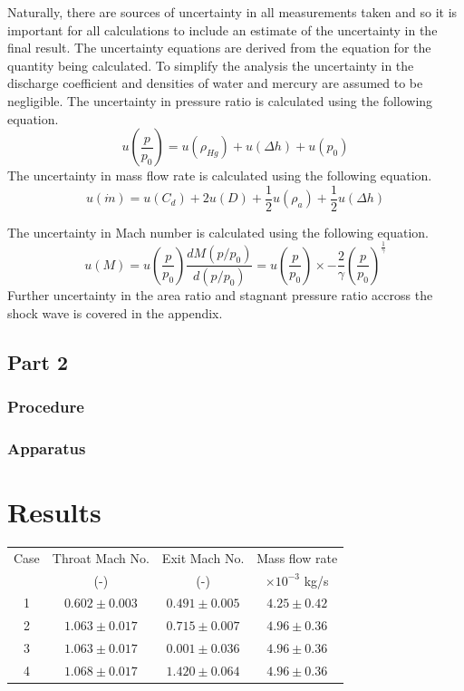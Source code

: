 \documentclass{article}
\begin{document}
Naturally, there are sources of uncertainty in all measurements taken and so it is important for all calculations to include an estimate of the uncertainty in the final result.
The uncertainty equations are derived from the equation for the quantity being calculated.
To simplify the analysis the uncertainty in the discharge coefficient and densities of water and mercury are assumed to be negligible.
The uncertainty in pressure ratio is calculated using the following equation.
\begin{equation}
    u\left( \frac{p}{p_0} \right) = u(\rho_{Hg}) + u(\Delta h) + u(p_0)
\end{equation}
The uncertainty in mass flow rate is calculated using the following equation.
\begin{equation}
    u(\dot{m}) = u(C_d) + 2u(D) + \frac{1}{2}u(\rho_a) + \frac{1}{2}u(\Delta h)
\end{equation}

The uncertainty in Mach number is calculated using the following equation.
\begin{equation}
    u(M) = u\left( \frac{p}{p_0} \right) \frac{d M ( p/p_0 ) }{d (p/p_0)} = u\left(\frac{p}{p_0}\right) \times - \frac{2}{\gamma}  \left( \frac{p}{p_0} \right) ^ {\frac{1}{\gamma}}
\end{equation}
Further uncertainty in the area ratio and stagnant pressure ratio accross the shock wave is covered in the appendix.

\subsection{Part 2}
\subsubsection{Procedure}
\subsubsection{Apparatus}

\section{Results}

\begin{center}
    \begin{tabular}{|c|c|c|c|}
    \hline 
    Case & Throat Mach No.  & Exit Mach No. & Mass flow rate\\
     & (-) & (-) & $\times 10^{-3}$ kg/s\\
    \hline 
    1 & $0.602\pm 0.003$ & $0.491\pm 0.005$ & $ 4.25\pm 0.42  $ \\
    2 & $1.063\pm 0.017$ & $0.715\pm 0.007$ & $ 4.96\pm 0.36  $ \\
    3 & $1.063\pm 0.017$ & $0.001\pm 0.036$ & $ 4.96\pm 0.36 $ \\
    4 & $1.068\pm 0.017$ & $1.420\pm 0.064$ & $ 4.96\pm 0.36 $ \\
    \hline
    \end{tabular}
    \label{tab:1}
\end{center}
\end{document}
